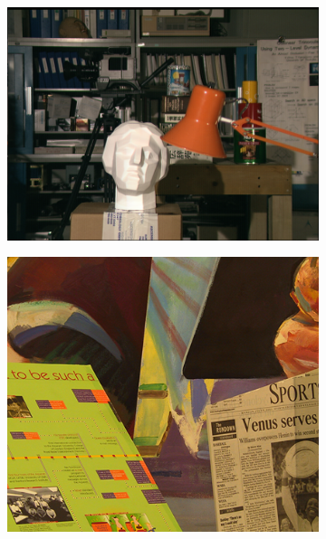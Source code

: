 \documentclass[letterpaper,12pt]{article}
\begin{document}
\begin{figure}
\begin{subfigure}[b]{0.2\textwidth}
                \label{fig:teddy}
        \end{subfigure}
        \quad
        ~ %
        \begin{subfigure}[b]{0.2\textwidth}
                \includegraphics[width=\textwidth]{tsukubaL.png}
                \label{fig:tsukuba}
        \end{subfigure}
        \quad
        \begin{subfigure}[b]{0.2\textwidth}
                \includegraphics[width=\textwidth]{venusL.png}

\end{subfigure}
\end{figure}
\end{document}
